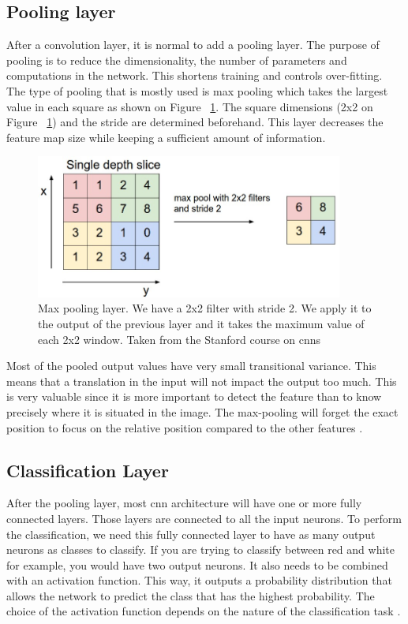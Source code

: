 \subsection{Pooling layer}
After a convolution layer, it is normal to add a pooling layer. The purpose of pooling is to reduce the dimensionality, the number of parameters and computations in the network. This shortens training and controls over-fitting.
The type of pooling that is mostly used is max pooling which takes the largest value in each square as shown on Figure ~\ref{fig:maxpool}. The square dimensions (2x2 on Figure ~\ref{fig:maxpool})  and the stride are determined beforehand. This layer decreases the feature map size while keeping a sufficient amount of information. 
	\begin{figure}[!htp]
    \centering
        \includegraphics[width=0.9\textwidth]{figures/02-maxpool}
        \caption[Max Pooling layer]{Max pooling layer. We have a 2x2 filter with stride 2. We apply it to the output of the previous layer and it takes the maximum value of each 2x2 window. Taken from the Stanford course on \gls{cnn}s \cite{cs231n}}\label{fig:maxpool}
    \end{figure}
 
   
Most of the pooled output values have very small transitional variance. This means that a translation in the input will not impact the output too much. This is very valuable since it is more important to detect the feature than to know precisely where it is situated in the image. The max-pooling will forget the exact position to focus on the relative position compared to the other features \cite{cs231n}.

\subsection{Classification Layer}
\label{sec:class_lay}
After the pooling layer, most \gls{cnn} architecture will have one or more fully connected layers. Those layers are connected to all the input neurons. To perform the classification, we need this fully connected layer to have as many output neurons as classes to classify. If you are trying to classify between red and white for example, you would have two output neurons.  It also needs to be combined with an activation function. This way, it outputs a probability distribution that allows the network to predict the class that has the highest probability. The choice of the activation function depends on the nature of the classification task \cite{deepbook}.
